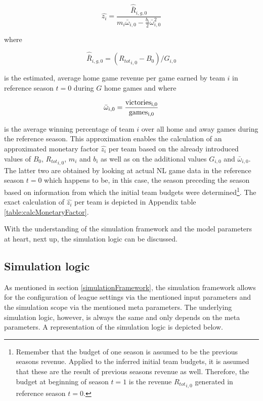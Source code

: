 \documentclass[12pt, a4paper]{article}
\begin{document}
\begin{equation}
\label{eq:monetaryFactor}
\hat{z_i}= \frac{\hat{\bar{R}}_{i,g,0}}{m_i\bar{\omega}_{i,0}-\frac{b_i}{2}\bar{\omega}_{i,0}^2}
\end{equation}
\par
\noindent
where 

\begin{equation}
\label{eq:averageGameRevenue}
\hat{\bar{R}}_{i,g,0} = ({R_{tot}}_{i,0} - B_0)/ G_{i,0}
\end{equation}
\par
\noindent
is the estimated, average home game revenue per game earned by team $i$ in reference season $t=0$ during $G$ home games and where 

\begin{equation}
\label{eq:averageWinPercentag}
\bar{\omega}_{i,0}=\frac{\textrm{victories\textsubscript{i,0}}}{\textrm{games\textsubscript{i,0}}}
\end{equation}
\par
\noindent
is the average winning percentage of team $i$ over all home and away games during the reference season. This approximation enables the calculation of an approximated monetary factor $\hat{z_i}$ per team based on the already introduced values of $B_0$, ${R_{tot}}_{i,0}$, $m_i$ and $b_i$ as well as on the additional values $G_{i,0}$ and $\bar{\omega}_{i,0}$. The latter two are obtained by looking at actual NL game data in the reference season $t=0$ which happens to be, in this case, the season preceding the season based on information from which the initial team budgets were determined\footnote{Remember that the budget of one season is assumed to be the previous seasons revenue. Applied to the inferred initial team budgets, it is assumed that these are the result of previous seasons revenue as well. Therefore, the budget at beginning of season $t=1$ is the revenue ${R_{tot}}_{i,0}$ generated in reference season $t=0$.}. The exact calculation of $\hat{z_i}$ per team is depicted in Appendix table \ref{table:calcMonetaryFactor}. 

\noindent
With the understanding of the simulation framework and the model parameters at heart, next up, the simulation logic can be discussed.

\subsection{Simulation logic}

As mentioned in section \ref{simulationFramework}, the simulation framework allows for the configuration of league settings via the mentioned input parameters and the simulation scope via the mentioned meta parameters. The underlying simulation logic, however, is always the same and only depends on the meta parameters. A representation of the simulation logic is depicted below.
\end{document}
